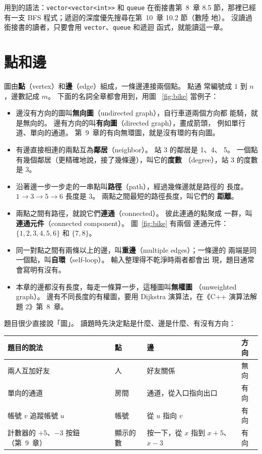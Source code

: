 用到的語法：\texttt{vector<vector<int>>} 和 \texttt{queue} 在銜接書第~8~章
8.5 節，那裡已經有一支 BFS 程式；遞迴的深度優先搜尋在第~10~章 10.2 節（數陸
地）。 沒讀過銜接書的讀者，只要會用 \texttt{vector}、\texttt{queue} 和遞迴
函式，就能讀這一章。

\section{點和邊}
\label{sec:graph-terms}

圖由\textbf{點}（vertex）和\textbf{邊}（edge）組成，一條邊連接兩個點。 點通
常編號成 $1$ 到 $n$，邊數記成 $m$。 下面的名詞全章都會用到，用圖
~\ref{fig:bike} 當例子：

\begin{itemize}
\item 邊沒有方向的圖叫\textbf{無向圖}（undirected graph），自行車道兩個方向都
能騎，就是無向的。 邊有方向的叫\textbf{有向圖}（directed graph），畫成箭頭，
例如單行道、單向的通道。 第~9~章的有向無環圖，就是沒有環的有向圖。
\item 有邊直接相連的兩點互為\textbf{鄰居}（neighbor）。 站 3 的鄰居是 1、4、
5。 一個點有幾個鄰居（更精確地說，接了幾條邊），叫它的\textbf{度數}
（degree），站 3 的度數是 $3$。
\item 沿著邊一步一步走的一串點叫\textbf{路徑}（path），經過幾條邊就是路徑的
長度。 $1 \to 3 \to 5 \to 6$ 長度是 $3$。 兩點之間最短的路徑長度，叫它們的
\textbf{距離}。
\item 兩點之間有路徑，就說它們\textbf{連通}（connected）。 彼此連通的點聚成
一群，叫\textbf{連通元件}（connected component）。 圖~\ref{fig:bike} 有兩個
連通元件：$\{1, 2, 3, 4, 5, 6\}$ 和 $\{7, 8\}$。
\item 同一對點之間有兩條以上的邊，叫\textbf{重邊}（multiple edges）；一條邊的
兩端是同一個點，叫\textbf{自環}（self-loop）。 輸入整理得不乾淨時兩者都會出
現，題目通常會寫明有沒有。
\item 本章的邊都沒有長度，每走一條算一步，這種圖叫\textbf{無權圖}
（unweighted graph）。 邊有不同長度的有權圖，要用 Dijkstra 演算法，在《C++ 演算法解題 2》第~8~章。
\end{itemize}

題目很少直接說「圖」。 讀題時先決定點是什麼、邊是什麼、有沒有方向：

\begin{center}
\begin{tabular}{llll}
\toprule
題目的說法 & 點 & 邊 & 方向 \\
\midrule
兩人互加好友 & 人 & 好友關係 & 無向 \\
單向的通道 & 房間 & 通道，從入口指向出口 & 有向 \\
帳號 $v$ 追蹤帳號 $u$ & 帳號 & 從 $u$ 指向 $v$ & 有向 \\
計數器的 $+5$、$-3$ 按鈕（第~9~章）& 顯示的數 & 按一下，從 $x$ 指到 $x + 5$、$x - 3$ & 有向 \\
\bottomrule
\end{tabular}
\end{center}

